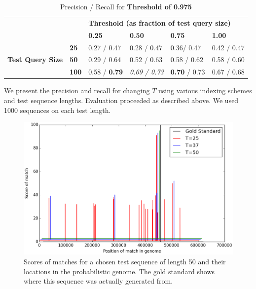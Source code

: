 \documentclass[11pt]{IEEEtran}
\begin{document}
\begin{table}[]
\centering
\caption{Precision / Recall for \textbf{Threshold of 0.975}}
\label{t975}
\begin{tabular}{ll|llll}
\cline{3-6}
                                                       &              & \multicolumn{4}{l|}{\textbf{Threshold (as fraction of test query size)}}                                                                          \\ \cline{3-6} 
\textbf{}                                              &              & \multicolumn{1}{l|}{\textbf{0.25}} & \multicolumn{1}{l|}{\textbf{0.50}} & \multicolumn{1}{l|}{\textbf{0.75}} & \multicolumn{1}{l|}{\textbf{1.00}} \\ \hline
\multicolumn{1}{|l|}{\multirow{3}{*}{\textbf{Test Query Size}}} & \textbf{25}  & 0.27 / 0.47                        & 0.28 / 0.47                         & 0.36/ 0.47                       & 0.42 / 0.47                      \\ \cline{2-2}
\multicolumn{1}{|l|}{}                                 & \textbf{50}  & 0.29 / 0.64                        & 0.52 / 0.63                         & 0.58 / 0.62                         & 0.58 / 0.60                        \\ \cline{2-2}
\multicolumn{1}{|l|}{}                                 & \textbf{100} & 0.58 / \textbf{0.79}                          & \emph{0.69 / 0.73}                    & \textbf{0.70} / 0.73                         & 0.67 / 0.68                        \\ \cline{1-2}
\end{tabular}
\end{table}

We present the precision and recall for changing $T$ using various indexing schemes and test sequence lengths. Evaluation proceeded as described above. We used 1000 sequences on each test length.

\begin{figure}
    \centering
    \includegraphics[scale=0.4]{dists}
    \caption{Scores of matches for a chosen test sequence of length 50 and their locations in the probabilistic genome. The gold standard shows where this sequence was actually generated from.}
    \label{dists}
\end{figure}
\end{document}
